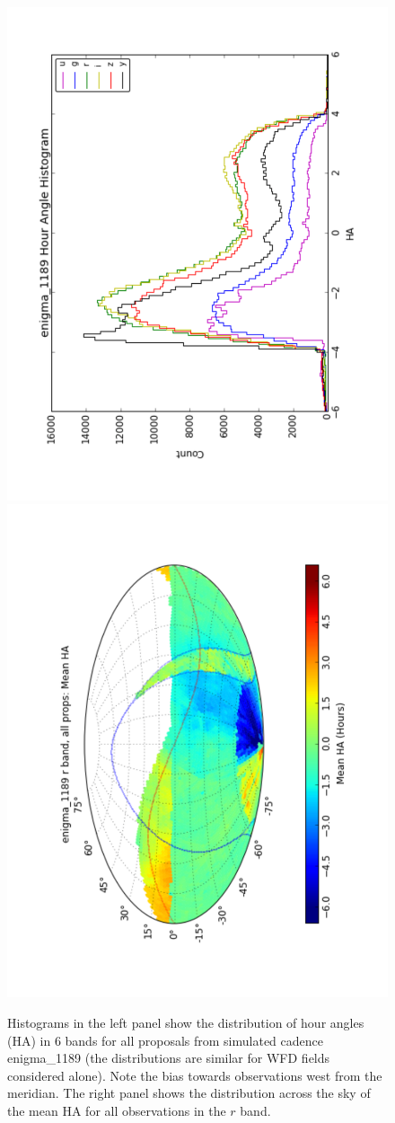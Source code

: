 \documentclass[manuscript]{article}
\begin{document}
\begin{figure}[t!]
\vskip -0.2in
\includegraphics[angle=270,width=0.49\hsize,clip]{enigma1189_HA.pdf}
\includegraphics[angle=270,width=0.49\hsize,clip]{enigma1189_meanHA.pdf}
\vskip -0.3in
\caption{Histograms in the left panel show the distribution of hour angles (HA) in 
6 bands for all proposals from simulated cadence enigma\_1189 (the distributions are 
similar for WFD fields considered alone). Note the bias towards observations west from 
the meridian. The right panel shows the distribution across the sky of the mean HA for 
all observations in the $r$ band. } 
\label{fig:HAenigma}
\end{figure}
\end{document}
